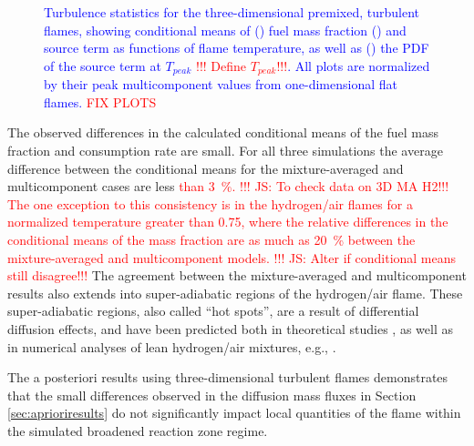 \documentclass[preprint,review,12pt]{elsarticle}
\begin{document}
\begin{figure}[htb]
\begin{subfigure}{0.33\textwidth}
        \caption{}\label{A posteriori (c)}
    \end{subfigure}
  \caption{\textcolor{blue}{Turbulence statistics for the three-dimensional premixed, turbulent flames, showing conditional means of () fuel mass fraction () and source term as functions of flame temperature, as well as () the PDF of the source term at $T_{peak}$ \textcolor{red}{!!! Define $T_{peak}$!!!}.  All plots are normalized by their peak multicomponent values from one-dimensional flat flames.} \textcolor{red}{FIX PLOTS}}\label{A posteriori}
\end{figure}

The observed differences in the calculated conditional means of the fuel mass fraction and consumption rate are small.
For all three simulations the average difference between the conditional means for the mixture-averaged and multicomponent cases are less \textcolor{red}{than \SI{3}{\%}.}
\textcolor{red}{!!! JS: To check data on 3D MA H2!!!} \textcolor{red}{The one exception to this consistency is in the hydrogen/air flames for a normalized temperature greater than 0.75, where the relative differences in the conditional means of the mass fraction are as much as \textcolor{red}{\SI{20}{\%}} between the mixture-averaged and multicomponent models.}
\textcolor{red}{!!! JS: Alter if conditional means still disagree!!!}  The agreement between the mixture-averaged and multicomponent results also extends into super-adiabatic regions of the hydrogen/air flame.
These super-adiabatic regions, also called ``hot spots'', are a result of differential diffusion effects, and have been predicted both in theoretical studies \cite{Williams:1985}, as well as in numerical analyses of lean hydrogen/air mixtures, e.g., \cite{Day:2009,AspdenJFM:2011,Aspden:2015}.

The a posteriori results using three-dimensional turbulent flames demonstrates that the small differences observed in the diffusion mass fluxes in Section \ref{sec:aprioriresults} do not significantly impact local quantities of the flame within the simulated broadened reaction zone regime.
\end{document}
